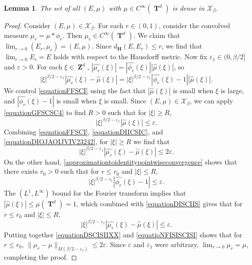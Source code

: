 \documentclass[dvipsnames,letterpaper,12pt]{article}
\numberwithin{equation}{section}
\DeclareMathOperator{\ZZ}{\mathbf{Z}}
\DeclareMathOperator{\TT}{\mathbf{T}}
\newtheorem{lemma}[theorem]{Lemma}
\numberwithin{theorem}{section}
\begin{document}
\begin{lemma} \label{smoothdensitylemma}
    The set of all $(E,\mu)$ with $\mu \in C^\infty(\TT^d)$ is dense in $\mathcal{X}_\beta$.
\end{lemma}
\begin{proof}
    Consider $(E,\mu) \in \mathcal{X}_\beta$. For each $r \in (0,1)$, consider the convolved measure $\mu_r = \mu * \phi_r$. Then $\mu_r \in C^\infty(\TT^d)$. We claim that $\lim_{r \to 0} (E_r,\mu_r) = (E,\mu)$. Since $d_{\mathbf{H}}(E,E_r) \leq r$, we find that $\lim_{r \to 0} E_r = E$ holds with respect to the Hausdorff metric. Now fix $\varepsilon_1 \in (0,\beta/2]$ and $\varepsilon > 0$. For each $\xi \in \ZZ^d$, $|\widehat{\mu_r}(\xi)| = |\widehat{\phi_r}(\xi)| |\widehat{\mu}(\xi)|$, so
    \begin{equation} \label{equationFFSCI}
        |\xi|^{\beta/2 - \varepsilon_1} |\widehat{\mu_r}(\xi) - \widehat{\mu}(\xi)| = |\xi|^{\beta/2 - \varepsilon_1} |\widehat{\phi_r}(\xi) - 1| |\widehat{\mu}(\xi)|.
    \end{equation}
    We control \eqref{equationFFSCI} using the fact that $|\widehat{\mu}(\xi)|$ is small when $\xi$ is large, and $|\widehat{\phi_r}(\xi) - 1|$ is small when $\xi$ is small. Since $(E,\mu) \in \mathcal{X}_\beta$, we can apply \eqref{equationGFSCSC4} to find $R > 0$ such that for $|\xi| \geq R$,
    \begin{equation} \label{equationDIICSIC}
        |\xi|^{\beta/2 - \varepsilon_1} |\widehat{\mu}(\xi)| \leq \varepsilon.
    \end{equation}
    Combining \eqref{equationFFSCI}, \eqref{equationDIICSIC}, and \eqref{equationDIOJAOIJVIV23242}, for $|\xi| \geq R$ we find that
    \begin{equation} \label{equationDSCISIIXX}
        |\xi|^{\beta/2 - \varepsilon_1} |\widehat{\mu_r}(\xi) - \widehat{\mu}(\xi)| \leq 2 \varepsilon.
    \end{equation}
    On the other hand, \eqref{approximationtoidentitypointwiseconvergence} shows that there exists $r_0 > 0$ such that for $r \leq r_0$ and $|\xi| \leq R$,
    \begin{equation} \label{equationDISCIIS}
        |\xi|^{\beta/2 - \varepsilon_1} |\widehat{\phi_r}(\xi) - 1| \leq \varepsilon.
    \end{equation}
    The $(L^1,L^\infty)$ bound for the Fourier transform implies that $|\widehat{\mu}(\xi)| \leq \mu(\TT^d) = 1$, which combined with \eqref{equationDISCIIS} gives that for $r \leq r_0$ and $|\xi| \leq R$,
    \begin{equation} \label{equatioNFISISCISI}
        |\xi|^{\beta/2 - \varepsilon_1} |\widehat{\mu_r}(\xi) - \widehat{\mu}(\xi)| \leq \varepsilon.
    \end{equation}
    Putting together \eqref{equationDSCISIIXX} and \eqref{equatioNFISISCISI} shows that for $r \leq r_0$, $\| \mu_r - \mu \|_{M(\beta/2 - \varepsilon_1)} \leq 2\varepsilon$. Since $\varepsilon$ and $\varepsilon_1$ were arbitrary, $\lim_{r \to 0} \mu_r = \mu$, completing the proof.
\end{proof}
\end{document}
